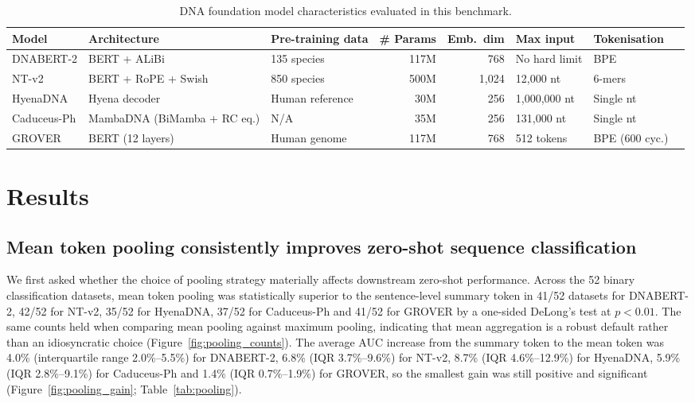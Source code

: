 \documentclass[11pt,a4paper]{article}
\begin{document}
\begin{table}[htbp]
\centering
\small
\caption{DNA foundation model characteristics evaluated in this benchmark.}
\label{tab:models}
\begin{tabular}{@{}lllrrlll@{}}
\toprule
Model & Architecture & Pre-training data & \# Params & Emb.\ dim & Max input & Tokenisation \\
\midrule
DNABERT-2   & BERT + ALiBi                  & 135 species          & 117M & 768   & No hard limit     & BPE \\
NT-v2       & BERT + RoPE + Swish           & 850 species          & 500M & 1{,}024 & 12{,}000 nt       & 6-mers \\
HyenaDNA    & Hyena decoder                 & Human reference      & 30M  & 256   & 1{,}000{,}000 nt   & Single nt \\
Caduceus-Ph & MambaDNA (BiMamba + RC eq.)   & N/A                  & 35M  & 256   & 131{,}000 nt      & Single nt \\
GROVER      & BERT (12 layers)              & Human genome         & 117M & 768   & 512 tokens        & BPE (600 cyc.) \\
\bottomrule
\end{tabular}
\end{table}

\section{Results}

\subsection{Mean token pooling consistently improves zero-shot sequence classification}
We first asked whether the choice of pooling strategy materially affects downstream zero-shot performance. Across the 52 binary classification datasets, mean token pooling was statistically superior to the sentence-level summary token in 41/52 datasets for DNABERT-2, 42/52 for NT-v2, 35/52 for HyenaDNA, 37/52 for Caduceus-Ph and 41/52 for GROVER by a one-sided DeLong's test at $p < 0.01$. The same counts held when comparing mean pooling against maximum pooling, indicating that mean aggregation is a robust default rather than an idiosyncratic choice (Figure~\ref{fig:pooling_counts}). The average AUC increase from the summary token to the mean token was 4.0\% (interquartile range 2.0\%--5.5\%) for DNABERT-2, 6.8\% (IQR 3.7\%--9.6\%) for NT-v2, 8.7\% (IQR 4.6\%--12.9\%) for HyenaDNA, 5.9\% (IQR 2.8\%--9.1\%) for Caduceus-Ph and 1.4\% (IQR 0.7\%--1.9\%) for GROVER, so the smallest gain was still positive and significant (Figure~\ref{fig:pooling_gain}; Table~\ref{tab:pooling}).
\end{document}
